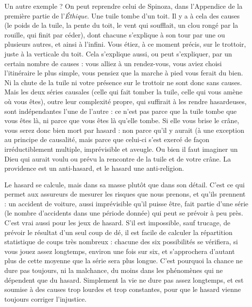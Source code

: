 Un autre exemple ? On peut reprendre celui de Spinoza, dans l’Appendice
de la première partie de l'{\it Éthique}. Une tuile tombe d’un toit. Il y a à cela des
causes (le poids de la tuile, la pente du toit, le vent qui soufflait, un clou rongé
par la rouille, qui finit par céder), dont chacune s'explique à son tour par une
ou plusieurs autres, et ainsi à l'infini. Vous étiez, à ce moment précis, sur le
trottoir, juste à la verticale du toit. Cela s'explique aussi, ou peut s'expliquer,
par un certain nombre de causes : vous alliez à un rendez-vous, vous aviez
choisi l'itinéraire le plus simple, vous pensiez que la marche à pied vous ferait
du bien. Ni la chute de la tuile ni votre présence sur le trottoir ne sont donc
sans causes. Mais les deux séries causales (celle qui fait tomber la tuile, celle qui
vous amène où vous êtes), outre leur complexité propre, qui suffirait à les
rendre hasardeuses, sont indépendantes l’une de l’autre : ce n’est pas parce que
la tuile tombe que vous êtes là, ni parce que vous êtes là qu’elle tombe. Si elle
vous brise le crâne, vous serez donc bien mort par hasard : non parce qu’il y
aurait (à une exception au principe de causalité, mais parce que celui-ci s’est
exercé de façon irréductiblement multiple, imprévisible et aveugle. Ou bien il
faut imaginer un Dieu qui aurait voulu ou prévu la rencontre de la tuile et de
votre crâne. La providence est un anti-hasard, et le hasard une anti-religion.

Le hasard se calcule, mais dans sa masse plutôt que dans son détail. C’est ce
qui permet aux assureurs de mesurer les risques que nous prenons, et qu’ils
prennent : un accident de voiture, aussi imprévisible qu’il puisse être, fait partie
d’une série (le nombre d’accidents dans une période donnée) qui peut se prévoir
à peu près. C’est vrai aussi pour les jeux de hasard. S’il est impossible, sauf
trucage, de prévoir le résultat d’un seul coup de dé, il est facile de calculer la
répartition statistique de coups très nombreux : chacune des six possibilités se
vérifiera, si vous jouez assez longtemps, environ une fois sur six, et s’approchera
d’autant plus de cette moyenne que la série sera plus longue. C’est pourquoi la
chance ne dure pas toujours, ni la malchance, du moins dans les phénomènes
qui ne dépendent que du hasard. Simplement la vie ne dure pas assez longtemps,
et est soumise à des causes trop lourdes et trop constantes, pour que le
hasard vienne toujours corriger l'injustice.


